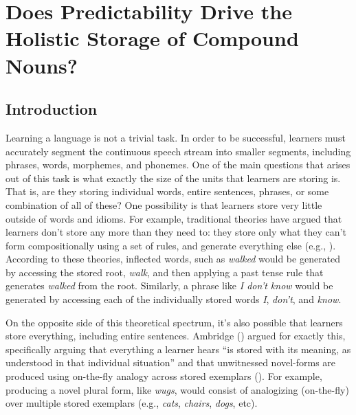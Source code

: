 \documentclass[
  12pt,
  letterpaper,
]{scrreport}
\begin{document}

\chapter{Does Predictability Drive the Holistic Storage of Compound
Nouns?}\label{does-predictability-drive-the-holistic-storage-of-compound-nouns}

\section{Introduction}\label{introduction-1}

Learning a language is not a trivial task. In order to be successful,
learners must accurately segment the continuous speech stream into
smaller segments, including phrases, words, morphemes, and phonemes. One
of the main questions that arises out of this task is what exactly the
size of the units that learners are storing is. That is, are they
storing individual words, entire sentences, phrases, or some combination
of all of these? One possibility is that learners store very little
outside of words and idioms. For example, traditional theories have
argued that learners don't store any more than they need to: they store
only what they can't form compositionally using a set of rules, and
generate everything else (e.g., ). According to these theories, inflected words, such as
\emph{walked} would be generated by accessing the stored root,
\emph{walk}, and then applying a past tense rule that generates
\emph{walked} from the root. Similarly, a phrase like \emph{I don't
know} would be generated by accessing each of the individually stored
words \emph{I}, \emph{don't}, and \emph{know}.

On the opposite side of this theoretical spectrum, it's also possible
that learners store everything, including entire sentences. Ambridge
() argued for
exactly this, specifically arguing that everything a learner hears ``is
stored with its meaning, as understood in that individual situation''
and that unwitnessed novel-forms are produced using on-the-fly analogy
across stored exemplars
().
For example, producing a novel plural form, like \emph{wugs}, would
consist of analogizing (on-the-fly) over multiple stored exemplars
(e.g., \emph{cats}, \emph{chairs}, \emph{dogs}, etc).
\end{document}
